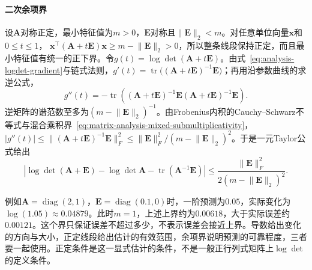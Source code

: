 \paragraph{二次余项界}
设$\bm A$对称正定，最小特征值为$m>0$，$\bm E$对称且$\lVert\bm E\rVert_2<m$。对任意单位向量$\bm x$和$0\leq t\leq1$，
$\bm x^\top(\bm A+t\bm E)\bm x\geq m-\lVert\bm E\rVert_2>0$，所以整条线段保持正定，而且最小特征值有统一的正下界。令$g(t)=\log\det(\bm A+t\bm E)$。由式~\eqref{eq:analysis-logdet-gradient}与链式法则，$g'(t)=\operatorname{tr}\bigl((\bm A+t\bm E)^{-1}\bm E\bigr)$；再用沿参数曲线的求逆公式，
\[
 g''(t)=-\operatorname{tr}\!\left((\bm A+t\bm E)^{-1}\bm E
 (\bm A+t\bm E)^{-1}\bm E\right).
\]
逆矩阵的谱范数至多为$(m-\lVert\bm E\rVert_2)^{-1}$。由Frobenius内积的Cauchy--Schwarz不等式与混合乘积界~\eqref{eq:matrix-analysis-mixed-submultiplicativity}，
$|g''(t)|\leq\lVert(\bm A+t\bm E)^{-1}\bm E\rVert_F^2\leq\lVert\bm E\rVert_F^2/(m-\lVert\bm E\rVert_2)^2$。于是一元Taylor公式给出
\[
 \left|\log\det(\bm A+\bm E)-\log\det\bm A
 -\operatorname{tr}(\bm A^{-1}\bm E)\right|
 \leq\frac{\lVert\bm E\rVert_F^2}{2(m-\lVert\bm E\rVert_2)^2}.
\]

例如$\bm A=\operatorname{diag}(2,1)$，$\bm E=\operatorname{diag}(0.1,0)$时，一阶预测为$0.05$，实际变化为$\log(1.05)\approx0.04879$。此时$m=1$，上述上界约为$0.00618$，大于实际误差约$0.00121$。这个界只保证误差不超过多少，不表示误差会接近上界。导数给出变化的方向与大小，正定线段给出估计的有效范围，余项界说明预测的可靠程度，三者要一起使用。正定条件是这一显式估计的条件，不是一般正行列式矩阵上$\log\det$的定义条件。
